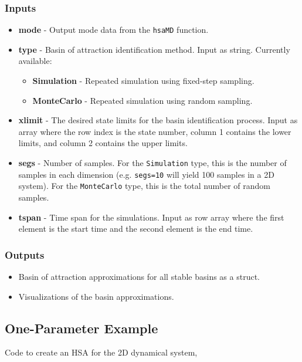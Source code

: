\documentclass[12pt]{article}
\begin{document}
\subsubsection{Inputs}
\begin{itemize}
\item \textbf{mode} - Output mode data from the \texttt{hsaMD} function.

\item \textbf{type} - Basin of attraction identification method. Input as string. Currently available:
	\begin{itemize}
	\item \textbf{Simulation} - Repeated simulation using fixed-step sampling.
	\item \textbf{MonteCarlo} - Repeated simulation using random sampling.
	\end{itemize}

\item \textbf{xlimit} - The desired state limits for the basin identification process. Input as array where the row index is the state number, column 1 contains the lower limits, and column 2 contains the upper limits.

\item \textbf{segs} - Number of samples. For the \texttt{Simulation} type, this is the number of samples in each dimension (e.g. \texttt{segs=10} will yield 100 samples in a 2D system). For the \texttt{MonteCarlo} type, this is the total number of random samples.

\item \textbf{tspan} - Time span for the simulations. Input as row array where the first element is the start time and the second element is the end time. 
\end{itemize}

\subsubsection{Outputs}
\begin{itemize}
\item Basin of attraction approximations for all stable basins as a struct.
\item Visualizations of the basin approximations.
\end{itemize}


\subsection{One-Parameter Example}
Code to create an HSA for the 2D dynamical system, 
\end{document}
